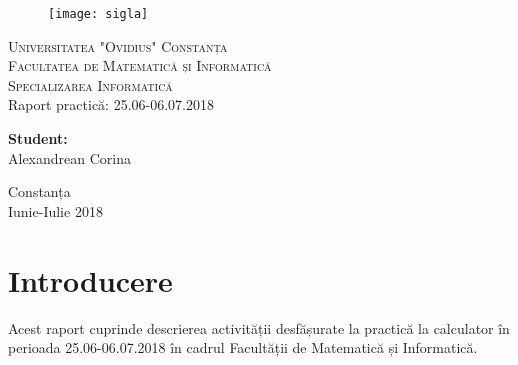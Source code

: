 \documentclass{report}
\begin{document}
\begin{titlepage}
 \begin{figure}
\texttt{[image: sigla]}\\
\end{figure}
\begin{center}
    \textsc{\normalsize Universitatea "Ovidius" Constanța\\
  Facultatea de Matematică și Informatică\\
  Specializarea Informatică}\\
  [4cm]
    {\Large \sc Raport practică: 25.06-06.07.2018}\\[7cm]
    \begin{flushright} \large
    \textbf{Student:\ \ \ \ \ } \\
    Alexandrean Corina
   \end{flushright}
  \vfill
  {\large Constanța}\\
  {\large Iunie-Iulie 2018}
 \end{center}
\end{titlepage}

\tableofcontents
\chapter{Introducere}

Acest raport cuprinde descrierea activității desfășurate la practică la calculator în perioada 25.06-06.07.2018 în cadrul Facultății de Matematică și Informatică.
\end{document}
